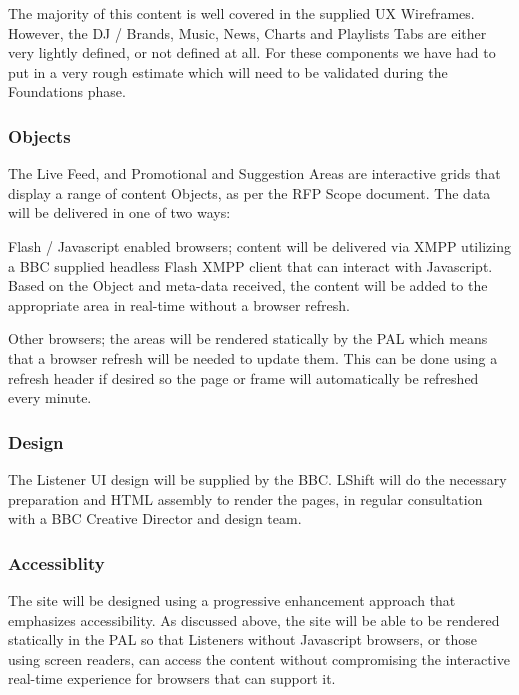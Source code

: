 \documentclass[a4paper, 11pt]{scrreprt}
\begin{document}
The majority of this content is well covered in the supplied UX Wireframes. However, the DJ / Brands, Music, News, Charts and Playlists Tabs are either very lightly defined, or not defined at all. For these components we have had to put in a very rough estimate which will need to be validated during the Foundations phase.


\subsubsection{Objects}
\label{h.nkw15bbh3elf}
The Live Feed, and Promotional and Suggestion Areas are interactive grids that display a range of content Objects, as per the RFP Scope document. The data will be delivered in one of two ways:



\begin{tystrul}


\item Flash / Javascript enabled browsers; content will be delivered via XMPP utilizing a BBC supplied headless Flash XMPP client that can interact with Javascript. Based on the Object and meta-data received, the content will be added to the appropriate area in real-time without a browser refresh.

\item Other browsers; the areas will be rendered statically by the PAL which means that a browser refresh will be needed to update them. This can be done using a refresh header if desired so the page or frame will automatically be refreshed every minute.	

\end{tystrul}


\subsubsection{Design}
\label{h.q9yn9z4wxpq9}
The Listener UI design will be supplied by the BBC. LShift will do the necessary preparation and HTML assembly to render the pages, in regular consultation with a BBC Creative Director and design team.


\subsubsection{Accessiblity}
\label{h.axz0q8rg5jok}
The site will be designed using a progressive enhancement approach that emphasizes accessibility. As discussed above, the site will be able to be rendered statically in the PAL so that Listeners without Javascript browsers, or those using screen readers, can access the content without compromising the interactive real-time experience for browsers that can support it.
\end{document}
